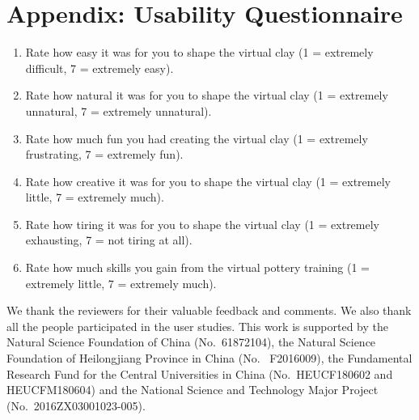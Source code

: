 \documentclass{svjour3}                     %
\begin{document}
\section*{Appendix: Usability Questionnaire}

\begin{enumerate}
\item Rate how easy it was for you to shape the virtual clay (1 = extremely difficult, 7 = extremely easy).
\item Rate how natural it was for you to shape the virtual clay (1 = extremely unnatural, 7 = extremely unnatural).
\item Rate how much fun you had creating the virtual clay (1 = extremely frustrating, 7 = extremely fun).
\item Rate how creative it was for you to shape the virtual clay (1 = extremely little, 7 = extremely much).
\item Rate how tiring it was for you to shape the virtual clay (1 = extremely exhausting, 7 = not tiring at all).
\item Rate how much skills you gain from the virtual pottery training (1 = extremely little, 7 = extremely much).

\end{enumerate}


\begin{acknowledgements}

We thank the reviewers for their valuable feedback and comments. 
%
We also thank all the people participated in the user studies.
%
This work is supported by the Natural Science Foundation of China (No.~61872104), the Natural Science Foundation of Heilongjiang Province in China (No.~ F2016009), the Fundamental Research Fund for the Central Universities in China (No.~HEUCF180602 and HEUCFM180604) and the National Science and Technology Major Project (No.~2016ZX03001023-005).
\end{acknowledgements}


%
%
\end{document}
